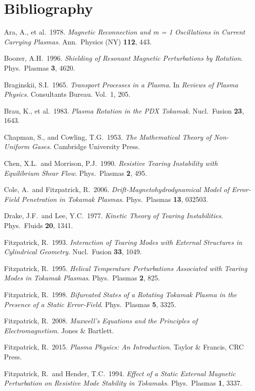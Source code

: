 \documentclass[notitlepage,12pt]{article}
\begin{document}
\section*{Bibliography}
\begin{description}
\item Ara, A., et al.\ 1978. {\em Magnetic Reconnection and m = 1 Oscillations in Current Carrying Plasmas}. Ann.\ Physics (NY) 
{\bf 112}, 443. 
\item Boozer, A.H.\ 1996. {\em Shielding of Resonant Magnetic Perturbations by Rotation}. Phys.\ Plasmas {\bf 3}, 4620.
\item Braginskii, S.I.\ 1965. {\em Transport Processes in a Plasma}. In {\em Reviews of Plasma Physics}. Consultants Bureau. Vol.~1, 205.
\item Brau, K., et al.\ 1983. {\em Plasma Rotation in the PDX Tokamak}. Nucl.\ Fusion {\bf 23}, 1643.
\item Chapman, S., and Cowling, T.G.\ 1953. {\em The Mathematical Theory of Non-Uniform Gases}. Cambridge University Press.
\item Chen, X.L.\ and Morrison, P.J.\ 1990. {\em Resistive Tearing Instability with Equilibrium Shear Flow}. Phys.\ Plasmas {\bf 2}, 495. 
\item Cole, A.\ and Fitzpatrick, R.\ 2006. {\em Drift-Magnetohydrodynamical Model of Error-Field Penetration in Tokamak
Plasmas}. Phys.\ Plasmas {\bf 13}, 032503. 
\item Drake, J.F.\ and Lee, Y.C.\ 1977. {\em Kinetic Theory of Tearing Instabilities}. Phys.\ Fluids {\bf 20}, 1341.
\item Fitzpatrick, R.\ 1993. {\em Interaction of Tearing Modes with External Structures in Cylindrical Geometry}. Nucl.\ Fusion {\bf 33}, 1049. 
\item Fitzpatrick, R.\ 1995. {\em Helical Temperature Perturbations Associated with Tearing Modes in Tokamak Plasmas}. Phys.\ Plasmas {\bf 2}, 825. 
\item Fitzpatrick, R.\ 1998. {\em Bifurcated States of a Rotating Tokamak Plasma in the Presence of a Static Error-Field}. Phys.\ Plasmas {\bf 5}, 3325. 
\item Fitzpatrick, R.\ 2008. {\em Maxwell's Equations and the Principles of Electromagnetism}. Jones \& Bartlett.
\item Fitzpatrick, R.\ 2015. {\em Plasma Physics: An Introduction}. Taylor \& Francis, CRC Press. 
\item Fitzpatrick, R.\ and Hender, T.C.\ 1994. {\em Effect of a Static External Magnetic Perturbation on Resistive Mode Stability in Tokamaks}. Phys.\ Plasmas {\bf 1}, 3337. 

\end{description}
\end{document}
